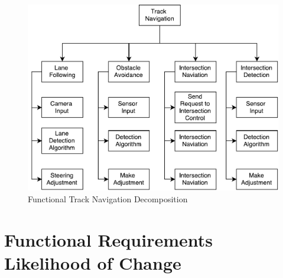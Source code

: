 \documentclass [11pt]{article}
\begin{document}
\pagebreak

\begin{figure} [h!]
	\caption{Functional Track Navigation Decomposition}\bigskip
	\centering
	\includegraphics [scale =.8] {figures/function_decomp_track_n.pdf}
	
\end{figure}





\section{Functional Requirements Likelihood of Change} 
\end{document}
